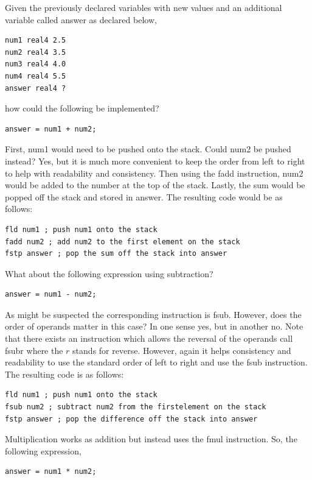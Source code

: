 \documentclass[10pt]{book}
\begin{document}
Given the previously declared variables with new values and an additional variable called answer as declared below,

\begin{verbatim}
num1 real4 2.5
num2 real4 3.5
num3 real4 4.0
num4 real4 5.5
answer real4 ?
\end{verbatim}

how could the following be implemented?
\begin{verbatim}
answer = num1 + num2;
\end{verbatim}

First, num1 would need to be pushed onto the stack. Could num2 be pushed instead? Yes, but it is much more convenient to keep the order from left to right to help with readability and consistency. Then using the fadd instruction, num2 would be added to the number at the top of the stack. Lastly, the sum would be popped off the stack and stored in answer. The resulting code would be as follows:

\begin{verbatim}
fld num1 ; push num1 onto the stack
fadd num2 ; add num2 to the first element on the stack
fstp answer ; pop the sum off the stack into answer
\end{verbatim}

What about the following expression using subtraction?

\begin{verbatim}
answer = num1 - num2;
\end{verbatim}

As might be suspected the corresponding instruction is fsub. However, does the order of operands matter in this case? In one sense yes, but in another no. Note that there exists an instruction which allows the reversal of the operands call fsubr where the $r$ stands for reverse. However, again it helps consistency and readability to use the standard order of left to right and use the fsub instruction. The resulting code is as follows:

\begin{verbatim}
fld num1 ; push num1 onto the stack
fsub num2 ; subtract num2 from the firstelement on the stack
fstp answer ; pop the difference off the stack into answer
\end{verbatim}

Multiplication works as addition but instead uses the fmul instruction. So, the following expression,

\begin{verbatim}
answer = num1 * num2;
\end{verbatim}
\end{document}
